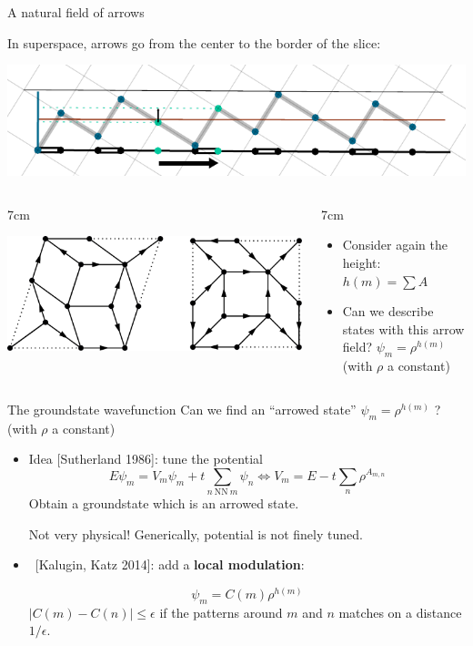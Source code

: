 \documentclass[xcolor=x11names,compress,professionalfonts, aspectratio=169]{beamer}
\renewcommand{\(}{\begin{columns}}
\renewcommand{\)}{\end{columns}}
\newcommand{\<}[1]{\begin{column}{#1}}
\renewcommand{\>}{\end{column}}
\begin{document}
\begin{frame}{A natural field of arrows}

In superspace, arrows go from the center to the border of the slice:

{\centering
\includegraphics[scale=.8]{img/cut_and_project_arrows.pdf}

}

\begin{columns}
\<{7cm}
{\centering
\includegraphics[scale=.35]{img/arrows_2D.pdf}

}
\>
\<{7cm}
\begin{itemize}
	\item Consider again the height: $h(m) = \sum A$
	\item Can we describe states with this arrow field? $\psi_m = \rho^{h(m)}$ (with $\rho$ a constant)
\end{itemize}
\>
\end{columns}

\end{frame}

\begin{frame}{The groundstate wavefunction}
Can we find an ``arrowed state'' $\psi_m = \rho^{h(m)}$ ? (with $\rho$ a constant)
\begin{itemize}
\item Idea [Sutherland 1986]: tune the potential
\[
	E \psi_m = V_m \psi_m + t \sum_{n ~\text{NN}~m} \psi_n \Longleftrightarrow V_m = E - t\sum_n \rho^{A_{m,n}}
\]
Obtain a groundstate which is an arrowed state.

Not very physical! Generically, potential is not finely tuned.

\item ~[Kalugin, Katz 2014]: add a \textbf{local modulation}:

\[
	\psi_m = C(m) \rho^{h(m)}
\]
$|C(m) - C(n)| \leq \epsilon$ if the patterns around $m$ and $n$ matches on a distance $1/\epsilon$.
\end{itemize}
\end{frame}
\end{document}
